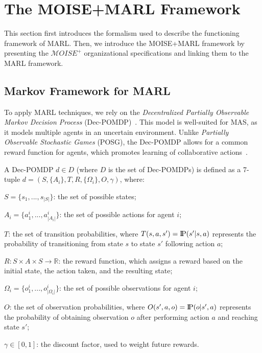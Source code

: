 \documentclass[sigconf,anonymous]{aamas}
\newcommand{\probP}{\text{I\kern-0.15em P}}
\begin{document}
\section{The MOISE+MARL Framework}
\label{sec:moise_marl_framework}

This section first introduces the formalism used to describe the functioning framework of MARL. Then, we introduce the MOISE+MARL framework by presenting the $\mathcal{M}OISE^+$ organizational specifications and linking them to the MARL framework.

\subsection{Markov Framework for MARL}

To apply MARL techniques, we rely on the \textit{Decentralized Partially Observable Markov Decision Process} (Dec-POMDP)~\citep{Oliehoek2016}. This model is well-suited for MAS, as it models multiple agents in an uncertain environment. Unlike \textit{Partially Observable Stochastic Games} (POSG), the Dec-POMDP allows for a common reward function for agents, which promotes learning of collaborative actions~\citep{Beynier2013}.

A Dec-POMDP $d \in D$ (where $D$ is the set of Dec-POMDPs) is defined as a 7-tuple $d = (S, \{A_i\}, T, R, \{\Omega_i\}, O, \gamma)$, where:
%
\begin{itemize*}[label={},itemjoin={; \quad}]
    \item $S = \{s_1,...,s_{|S|}\}$: the set of possible states;
    \item $A_{i} = \{a_{1}^{i},...,a_{|A_{i}|}^{i}\}$: the set of possible actions for agent $i$;
    \item $T$: the set of transition probabilities, where $T(s,a,s') = \probP(s'|s,a)$ represents the probability of transitioning from state $s$ to state $s'$ following action $a$;
    \item $R: S \times A \times S \rightarrow \mathbb{R}$: the reward function, which assigns a reward based on the initial state, the action taken, and the resulting state;
    \item $\Omega_{i} = \{o_{1}^{i},...,o_{|\Omega_{i}|}^{i}\}$: the set of possible observations for agent $i$;
    \item $O$: the set of observation probabilities, where $O(s',a,o) = \probP(o|s',a)$ represents the probability of obtaining observation $o$ after performing action $a$ and reaching state $s'$;
    \item $\gamma \in [0,1]$: the discount factor, used to weight future rewards.
\end{itemize*}
\end{document}
